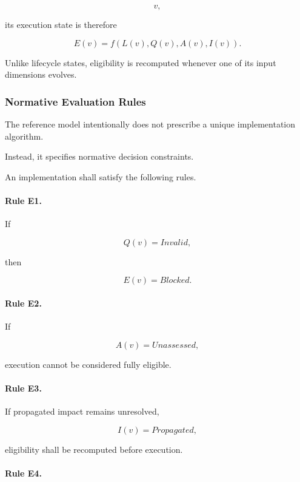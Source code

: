 \documentclass[10pt]{article}
\begin{document}
\[
v,
\]

its execution state is therefore

\[
E(v)
=
f
(
L(v),
Q(v),
A(v),
I(v)
).
\]

Unlike lifecycle states, eligibility is recomputed whenever one of its input
dimensions evolves.

\subsubsection{Normative Evaluation Rules}

The reference model intentionally does not prescribe a unique implementation
algorithm.

Instead, it specifies normative decision constraints.

An implementation shall satisfy the following rules.

\paragraph{Rule E1.}

If

\[
Q(v)=Invalid,
\]

then

\[
E(v)=Blocked.
\]


\paragraph{Rule E2.}

If

\[
A(v)=Unassessed,
\]

execution cannot be considered fully eligible.


\paragraph{Rule E3.}

If propagated impact remains unresolved,

\[
I(v)=Propagated,
\]

eligibility shall be recomputed before execution.


\paragraph{Rule E4.}
\end{document}
